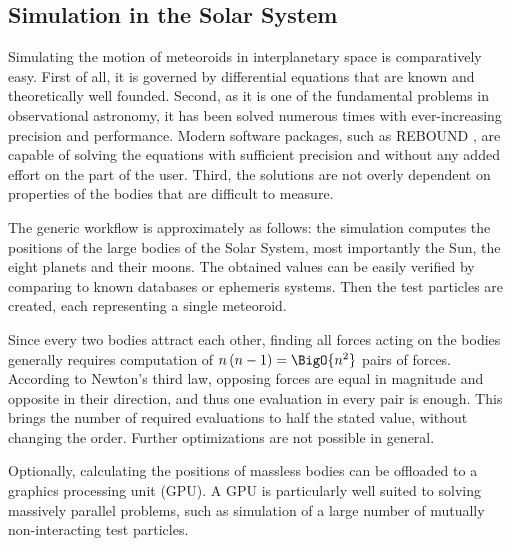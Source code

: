     \subsection{Simulation in the Solar System} \label{mio}
        Simulating the motion of meteoroids in interplanetary space is comparatively easy.
        First of all, it is governed by differential equations that are known and theoretically well founded.
        Second, as it is one of the fundamental problems in observational astronomy,
        it has been solved numerous times with ever-increasing precision and performance.
        Modern software packages, such as REBOUND \citep{rein+rebound}, are capable of solving the equations
        with sufficient precision and without any added effort on the part of the user.
        Third, the solutions are not overly dependent on properties of the bodies that are difficult to measure.

        The generic workflow is approximately as follows: the simulation computes the positions of
        the large bodies of the Solar System, most importantly the Sun, the eight planets and their moons.
        The obtained values can be easily verified by comparing to known databases or ephemeris systems.
        Then the test particles are created, each representing a single meteoroid.

        Since every two bodies attract each other, finding all forces acting on the bodies generally
        requires computation of $n\left(n - 1\right) = \BigO{n^2}$ pairs of forces.
        According to Newton's third law, opposing forces are equal in magnitude and opposite in their direction,
        and thus one evaluation in every pair is enough.
        This brings the number of required evaluations to half the stated value, without changing the order.
        Further optimizations are not possible in general.

        Optionally, calculating the positions of massless bodies can be offloaded to a graphics processing unit (GPU).
        A GPU is particularly well suited to solving massively parallel problems,
        such as simulation of a large number of mutually non-interacting test particles.


